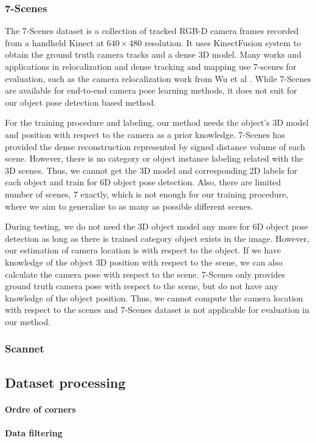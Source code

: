 \subsubsection{7-Scenes}
The 7-Scenes dataset is a collection of tracked RGB-D camera frames recorded from a handheld Kinect at $640 \times 480$ resolution. It uses KinectFusion system to obtain the ground truth camera tracks and a dense 3D model. Many works and applications in relocalization and dense tracking and mapping use 7-scenes for evaluation, such as the camera relocalization work from Wu et al \cite{wu2017delving}. While 7-Scenes are available for end-to-end camera pose learning methods, it does not suit for our object pose detection based method.

For the training procedure and labeling, our method needs the object's 3D model and position with respect to the camera as a prior knowledge. 7-Scenes has provided the dense reconstruction represented by signed distance volume of each scene. However, there is no category or object instance labeling related with the 3D scenes. Thus, we cannot get the 3D model and corresponding 2D labels for each object and train for 6D object pose detection. Also, there are limited number of scenes, 7 exactly, which is not enough for our training procedure, where we aim to generalize to as many as possible different scenes. 

During testing, we do not need the 3D object model any more for 6D object pose detection as long as there is trained category object exists in the image. However, our estimation of camera location is with respect to the object. If we have knowledge of the object 3D position with respect to the scene, we can also calculate the camera pose with respect to the scene. 7-Scenes only provides ground truth camera pose with respect to the scene, but do not have any knowledge of the object position. Thus, we cannot compute the camera location with respect to the scenes and 7-Scenes dataset is not applicable for evaluation in our method.

\subsubsection{Scannet}


\subsection{Dataset processing}

\paragraph{Ordre of corners}
\paragraph{Data filtering}

